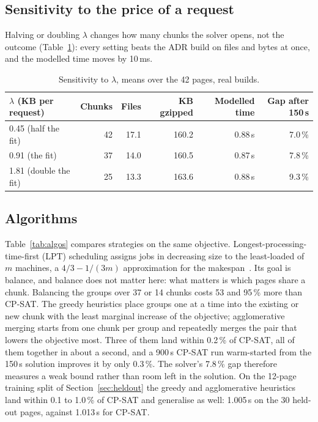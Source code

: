 \documentclass[11pt]{article}
\begin{document}
\subsection{Sensitivity to the price of a request}\label{sec:sensitivity}
Halving or doubling $\lambda$ changes how many chunks the solver opens, not the outcome (Table~\ref{tab:lambda}): every setting beats the ADR build on files and bytes at once, and the modelled time moves by 10\,ms.

\begin{table}[t]
\centering\small
\caption{Sensitivity to $\lambda$, means over the 42 pages, real builds.}
\label{tab:lambda}
\begin{tabular}{lrrrrr}
\toprule
$\lambda$ (KB per request) & Chunks & Files & KB gzipped & Modelled time & Gap after 150\,s\\
\midrule
0.45 (half the fit) & 42 & 17.1 & 160.2 & 0.88\,s & 7.0\,\%\\
0.91 (the fit) & 37 & 14.0 & 160.5 & 0.87\,s & 7.8\,\%\\
1.81 (double the fit) & 25 & 13.3 & 163.6 & 0.88\,s & 9.3\,\%\\
\bottomrule
\end{tabular}
\end{table}

\subsection{Algorithms}\label{sec:algos}
Table~\ref{tab:algos} compares strategies on the same objective. Longest-processing-time-first (LPT) scheduling assigns jobs in decreasing size to the least-loaded of $m$ machines, a $4/3 - 1/(3m)$ approximation for the makespan~\cite{graham1969}. Its goal is balance, and balance does not matter here: what matters is which pages share a chunk. Balancing the groups over 37 or 14 chunks costs 53 and 95\,\% more than CP-SAT. The greedy heuristics place groups one at a time into the existing or new chunk with the least marginal increase of the objective; agglomerative merging starts from one chunk per group and repeatedly merges the pair that lowers the objective most. Three of them land within 0.2\,\% of CP-SAT, all of them together in about a second, and a 900\,s CP-SAT run warm-started from the 150\,s solution improves it by only 0.3\,\%. The solver's 7.8\,\% gap therefore measures a weak bound rather than room left in the solution. On the 12-page training split of Section~\ref{sec:heldout} the greedy and agglomerative heuristics land within 0.1 to 1.0\,\% of CP-SAT and generalise as well: 1.005\,s on the 30 held-out pages, against 1.013\,s for CP-SAT.
\end{document}

